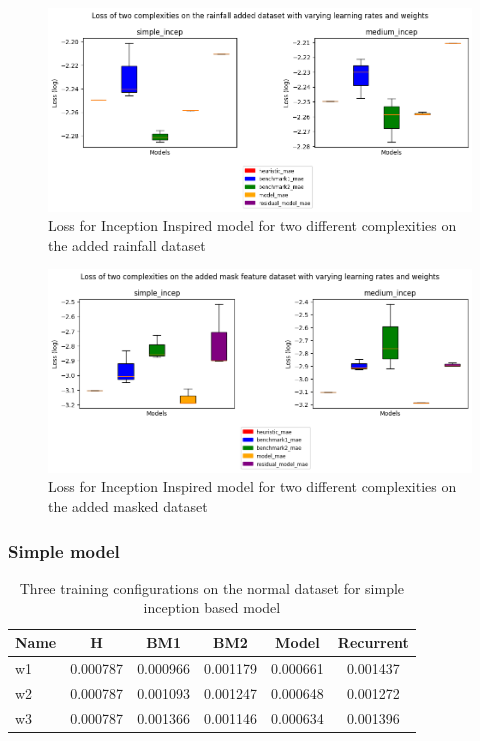\begin{figure}[tbph]
	\centering
	\includegraphics[width=0.8\linewidth, height=0.3\textheight]{Figures/Results/Inception_model/rainfall_dataset}
	\caption[Loss for Inception Inspired model for two different complexities on the added rainfall dataset]{Loss for Inception Inspired model for two different complexities on the added rainfall dataset}
	\label{fig:incep-rfdset}
\end{figure}

\begin{figure}[tbph]
	\centering
	\includegraphics[width=0.8\linewidth, height=0.3\textheight]{Figures/Results/Inception_model/mask_dataset}
	\caption[Loss for Inception Inspired model for two different complexities on the added mask dataset]{Loss for Inception Inspired model for two different complexities on the added masked dataset}
	\label{fig:incep-maskdset}
\end{figure}

\subsubsection*{Simple model}
\begin{table}[htbp]
	\centering
	\caption{Three training configurations on the normal dataset for simple inception based model}
	\label{tab:simple_normal}
	\begin{tabular}{p{2cm}ccccc}
		\toprule
		Name &  H &  BM1 &  BM2 &  Model &  Recurrent \\
		\midrule
		w1 &       0.000787 &        0.000966 &        0.001179 &   0.000661 &            0.001437 \\
		w2 &       0.000787 &        0.001093 &        0.001247 &   0.000648 &            0.001272 \\
		w3 &       0.000787 &        0.001366 &        0.001146 &   0.000634 &            0.001396 \\
		\bottomrule
	\end{tabular}
\end{table}

